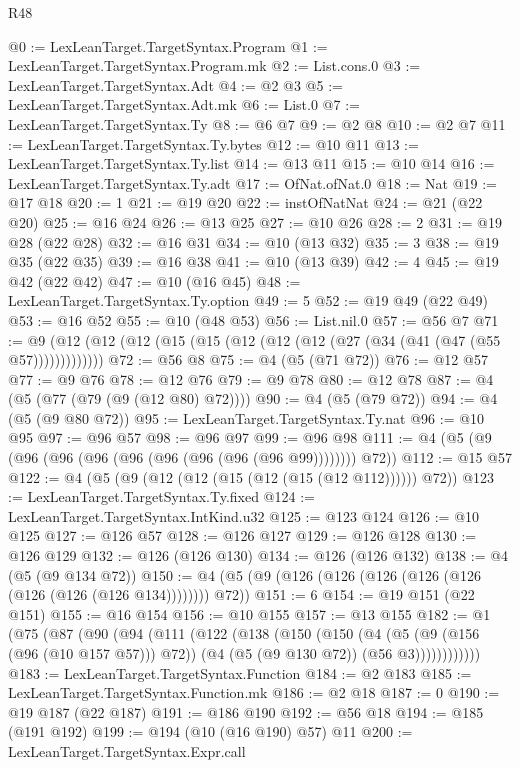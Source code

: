 \begin{lexlean}{R48}
\begin{coremodule}
@0 := LexLeanTarget.TargetSyntax.Program
@1 := LexLeanTarget.TargetSyntax.Program.mk
@2 := List.cons.{0}
@3 := LexLeanTarget.TargetSyntax.Adt
@4 := @2 @3
@5 := LexLeanTarget.TargetSyntax.Adt.mk
@6 := List.{0}
@7 := LexLeanTarget.TargetSyntax.Ty
@8 := @6 @7
@9 := @2 @8
@10 := @2 @7
@11 := LexLeanTarget.TargetSyntax.Ty.bytes
@12 := @10 @11
@13 := LexLeanTarget.TargetSyntax.Ty.list
@14 := @13 @11
@15 := @10 @14
@16 := LexLeanTarget.TargetSyntax.Ty.adt
@17 := OfNat.ofNat.{0}
@18 := Nat
@19 := @17 @18
@20 := 1
@21 := @19 @20
@22 := instOfNatNat
@24 := @21 (@22 @20)
@25 := @16 @24
@26 := @13 @25
@27 := @10 @26
@28 := 2
@31 := @19 @28 (@22 @28)
@32 := @16 @31
@34 := @10 (@13 @32)
@35 := 3
@38 := @19 @35 (@22 @35)
@39 := @16 @38
@41 := @10 (@13 @39)
@42 := 4
@45 := @19 @42 (@22 @42)
@47 := @10 (@16 @45)
@48 := LexLeanTarget.TargetSyntax.Ty.option
@49 := 5
@52 := @19 @49 (@22 @49)
@53 := @16 @52
@55 := @10 (@48 @53)
@56 := List.nil.{0}
@57 := @56 @7
@71 := @9 (@12 (@12 (@12 (@15 (@15 (@12 (@12 (@12 (@27 (@34 (@41 (@47 (@55 @57)))))))))))))
@72 := @56 @8
@75 := @4 (@5 (@71 @72))
@76 := @12 @57
@77 := @9 @76
@78 := @12 @76
@79 := @9 @78
@80 := @12 @78
@87 := @4 (@5 (@77 (@79 (@9 (@12 @80) @72))))
@90 := @4 (@5 (@79 @72))
@94 := @4 (@5 (@9 @80 @72))
@95 := LexLeanTarget.TargetSyntax.Ty.nat
@96 := @10 @95
@97 := @96 @57
@98 := @96 @97
@99 := @96 @98
@111 := @4 (@5 (@9 (@96 (@96 (@96 (@96 (@96 (@96 (@96 (@96 @99)))))))) @72))
@112 := @15 @57
@122 := @4 (@5 (@9 (@12 (@12 (@15 (@12 (@15 (@12 @112)))))) @72))
@123 := LexLeanTarget.TargetSyntax.Ty.fixed
@124 := LexLeanTarget.TargetSyntax.IntKind.u32
@125 := @123 @124
@126 := @10 @125
@127 := @126 @57
@128 := @126 @127
@129 := @126 @128
@130 := @126 @129
@132 := @126 (@126 @130)
@134 := @126 (@126 @132)
@138 := @4 (@5 (@9 @134 @72))
@150 := @4 (@5 (@9 (@126 (@126 (@126 (@126 (@126 (@126 (@126 (@126 @134)))))))) @72))
@151 := 6
@154 := @19 @151 (@22 @151)
@155 := @16 @154
@156 := @10 @155
@157 := @13 @155
@182 := @1
    (@75
      (@87
        (@90
          (@94
            (@111
              (@122
                (@138
                  (@150
                    (@150
                      (@4
                        (@5 (@9 (@156 (@96 (@10 @157 @57))) @72))
                        (@4 (@5 (@9 @130 @72)) (@56 @3))))))))))))
@183 := LexLeanTarget.TargetSyntax.Function
@184 := @2 @183
@185 := LexLeanTarget.TargetSyntax.Function.mk
@186 := @2 @18
@187 := 0
@190 := @19 @187 (@22 @187)
@191 := @186 @190
@192 := @56 @18
@194 := @185 (@191 @192)
@199 := @194 (@10 (@16 @190) @57) @11
@200 := LexLeanTarget.TargetSyntax.Expr.call

\end{coremodule}
\end{lexlean}
